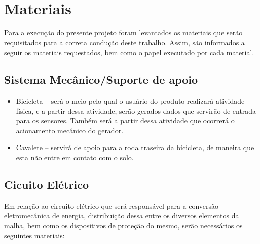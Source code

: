 \chapter[Materiais]{Materiais}

Para a execução do presente projeto foram levantados os materiais que serão requisitados para a correta condução deste trabalho. Assim, são informados a seguir os materiais requestados, bem como o papel executado por cada material.

\section{Sistema Mecânico/Suporte de apoio}
\begin{itemize}
\item Bicicleta – será o meio pelo qual o usuário do produto realizará atividade física, e  a partir dessa atividade, serão gerados dados que servirão de entrada para os sensores. Também será a partir dessa atividade que ocorrerá o acionamento mecânico do gerador.
\item Cavalete – servirá de apoio para a roda traseira da bicicleta, de maneira que esta não entre em contato com o solo.
\end{itemize}

\section{Cicuito Elétrico}

Em relação ao circuito elétrico que será responsável para a conversão eletromecânica de energia, distribuição dessa entre os diversos elementos da malha, bem como os dispositivos de proteção do mesmo, serão necessários os seguintes materiais:

